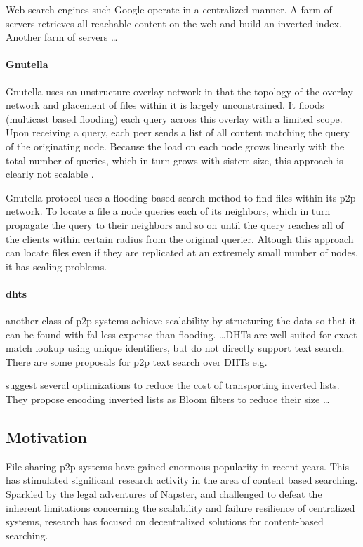 Web search engines such Google \cite{BP98} operate in a centralized manner. A farm of servers retrieves all reachable content on the web and build an inverted index. Another farm of servers \ldots

\paragraph{Gnutella} Gnutella uses an unstructure overlay network in that the topology of the overlay network and placement of files within it is largely unconstrained. It floods (multicast based flooding) each query across this overlay with a limited scope. Upon receiving a query, each peer sends a list of all content matching the query of the originating node. Because the load on each node grows linearly with the total number of queries, which in turn grows with sistem size, this approach is clearly not scalable \cite{CRB+03}.

Gnutella protocol uses a flooding-based search method to find files within its p2p network. To locate a file a node queries each of its neighbors, which in turn propagate the query to their neighbors and so on until the query reaches all of the clients within  certain radius from the original querier. Altough this approach can locate files even if they are replicated at an extremely small number of nodes, it has scaling problems.

\paragraph{dhts} another class of p2p systems achieve scalability by structuring the data so that it can be found with fal less expense than flooding. \ldots DHTs are well suited for exact match lookup using unique identifiers, but do not directly support text search. There are some proposals for p2p text search over DHTs e.g. \cite{RV03}

\cite{RV03}  suggest several optimizations to reduce the cost of transporting inverted lists. They propose encoding inverted lists as Bloom filters to reduce their size \ldots



\subsection{Motivation}
File sharing p2p systems have gained enormous popularity in recent years. This has stimulated significant research activity in the area of content based searching. Sparkled by the legal adventures of Napster, and challenged to defeat the inherent limitations concerning the scalability and failure resilience of centralized systems, research has focused on decentralized solutions for content-based searching.

